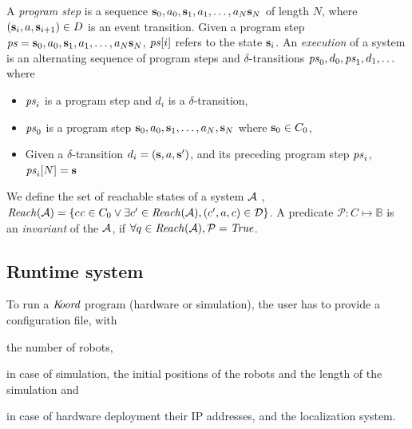 A \emph{program step} is a sequence  ${\textbf{s}}_0 , a_0,  {\textbf{s}}_1, a_1, \ldots  ,a_N {\textbf{s}}_N$ of length $N$, where $({\textbf{s}}_i , a , {\textbf{s}}_{i+1}) \in D$ is an event transition. Given a program step $\mathit{ps} = {\textbf{s}}_0 , a_0,  {\textbf{s}}_1, a_1, \ldots  ,a_N {\textbf{s}}_N$, $\mathit{ps}[i]$ refers to the state ${\textbf{s}}_i$.
An \emph{execution} of a system is an alternating sequence of program steps and $\delta$-transitions $\mathit{ps}_0, d_0 , \mathit{ps}_1, d_1, \ldots$ where
\begin{itemize}
\item $\mathit{ps}_i$ is a program step and $d_i$ is a $\delta$-transition,
\item $\mathit{ps}_0$ is a program step ${\textbf{s}}_0, a_0, {\textbf{s}}_1, \ldots ,a_N, {\textbf{s}}_N $  where ${\textbf{s}}_0 \in C_0$,
\item Given a $\delta$-transition $d_i = ({\textbf{s}}, a, {\textbf{s}}')$, and its preceding program step $\mathit{ps}_i$,  $\mathit{ps}_i[N] = {\textbf{s}} $
\end{itemize}
%



We define the set of reachable states of a system $\mathcal{A}$ , $\mathit{Reach}(\mathcal{A}) = \{c \mathit c \in C_0 \vee \exists c^\prime \in \mathit{Reach}(\mathcal{A}), (c^\prime, a, c) \in \mathcal{D} \}$. A predicate $\mathcal{P} : C \mapsto \mathbb{B}$ is an \emph{invariant} of the $\mathcal{A}$, if $\forall q \in \mathit{Reach}(\mathcal{A}), \mathcal{P} = \mathit{True}$.

\subsection{Runtime system}



To run a $\emph{K\kern-2pt oord}$ program (hardware or simulation), the user has to provide a configuration file, with
\begin{inparaenum}
    \item the number of robots,
    \item in case of simulation, the initial positions of the robots and the length of the simulation and
    \item in case of hardware deployment their IP addresses,
    and the localization system.
\end{inparaenum}



